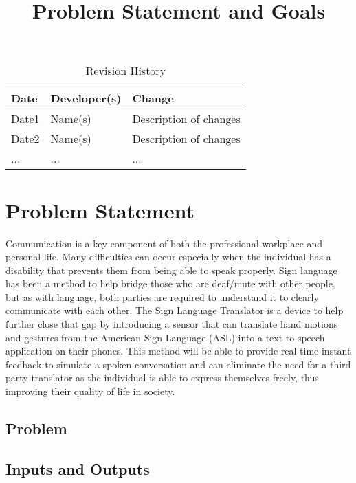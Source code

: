 \documentclass{article}
\title{Problem Statement and Goals\\\progname}
\author{\authname}
\date{}
\begin{document}
\maketitle

\begin{table}[hp]
\caption{Revision History} \label{TblRevisionHistory}
\begin{tabularx}{\textwidth}{llX}
\toprule
\textbf{Date} & \textbf{Developer(s)} & \textbf{Change}\\
\midrule
Date1 & Name(s) & Description of changes\\
Date2 & Name(s) & Description of changes\\
... & ... & ...\\
\bottomrule
\end{tabularx}
\end{table}

\section{Problem Statement}

Communication is a key component of both the professional workplace and personal life. Many difficulties can occur especially when the individual has a disability that prevents them from being able to speak properly. Sign language has been a method to help bridge those who are deaf/mute with other people, but as with language, both parties are required to understand it to clearly communicate with each other. The Sign Language Translator is a device to help further close that gap by introducing a sensor that can translate hand motions and gestures from the American Sign Language (ASL) into a text to speech application on their phones. This method will be able to provide real-time instant feedback to simulate a spoken conversation and can eliminate the need for a third party translator as the individual is able to express themselves freely, thus improving their quality of life in society. 

\subsection{Problem}

\subsection{Inputs and Outputs}

\end{document}
